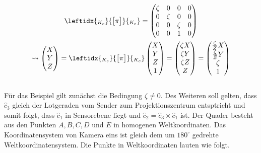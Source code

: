 \begin{gather}
\leftidx{_{K_{c}}}{\begin{bmatrix}
	\pi
	\end{bmatrix}}{_{K_{c}}} 
= 
\begin{pmatrix}
\zeta&0&0&0\\
0&\zeta&0&0\\
0&0&\zeta&0\\
0&0&1&0
\end{pmatrix}\\
\leadsto
\begin{pmatrix}
X\\Y\\Z
\end{pmatrix} = 
\leftidx{_{K_{c}}}{\begin{bmatrix}
	\pi
	\end{bmatrix}}{_{K_{c}}}
\begin{pmatrix}
X\\Y\\Z\\1
\end{pmatrix}
=
\begin{pmatrix}
\zeta X\\\zeta Y\\\zeta Z\\Z
\end{pmatrix}
=
\begin{pmatrix}
\frac{\zeta}{Z} X\\\frac{\zeta}{Z} Y\\\zeta\\1
\end{pmatrix}
\end{gather}\\

Für das Beispiel gilt zunächst die Bedingung $\zeta \neq 0$. Des Weiteren soll gelten, dass  \ensuremath{\hat{c}_3} gleich der Lotgeraden vom Sender zum Projektionszentrum entsptricht und somit folgt, dass \ensuremath{\hat{c}_1} in Sensorebene liegt und \ensuremath{\hat{c}_2 = \hat{c}_3 \times \hat{c}_1} ist. Der Quader besteht aus den Punkten $A,B,C, D$ und $E$ in homogenen Weltkoordinaten. Das Koordinatensystem von Kamera eins ist gleich dem um \ensuremath{180^\circ} gedrehte Weltkoordinatensystem. Die Punkte in Weltkoordinaten lauten wie folgt. 

